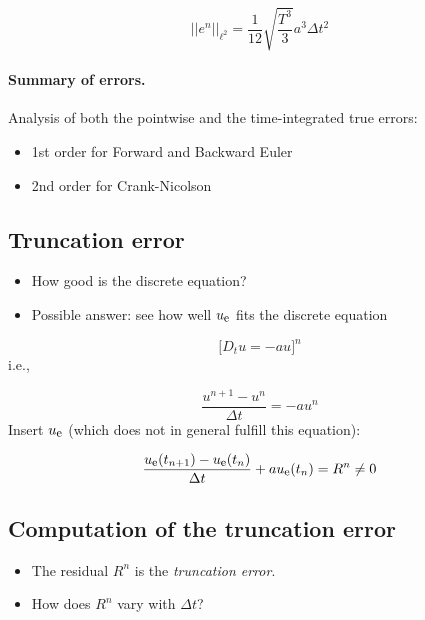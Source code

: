 \documentclass[%
oneside,                 %
final,                   %
10pt]{article}
\begin{document}
\[ ||e^n||_{\ell^2} = \frac{1}{12}\sqrt{\frac{T^3}{3}}a^3\Delta t^2\]



\paragraph{Summary of errors.}
Analysis of both the pointwise and the time-integrated true errors:

\begin{itemize}
  \item 1st order for Forward and Backward Euler

  \item 2nd order for Crank-Nicolson
\end{itemize}

\noindent



\subsection*{Truncation error}

\begin{itemize}
 \item How good is the discrete equation?

 \item Possible answer: see how well $\uex$ fits the discrete equation
\end{itemize}

\noindent
\[ \lbrack D_t u = -au\rbrack^n\]
i.e.,

\[ \frac{u^{n+1}-u^n}{\Delta t} = -au^n\]
Insert $\uex$ (which does not in general fulfill this equation):

\begin{equation}
\frac{\uex(t_{n+1})-\uex(t_n)}{\Delta t} + a\uex(t_n) = R^n \neq 0
\label{decay:analysis:trunc:Req}
\end{equation}

\subsection*{Computation of the truncation error}

\begin{itemize}
 \item The residual $R^n$ is the \emph{truncation error}.

 \item How does $R^n$ vary with $\Delta t$?
\end{itemize}
\end{document}
